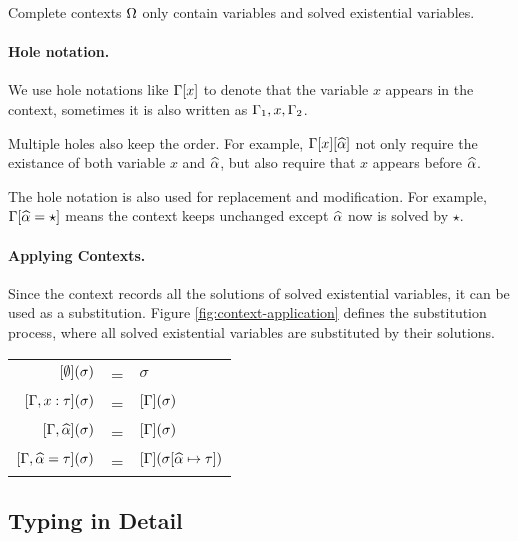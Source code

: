 Complete contexts $\Omega$ only contain variables and solved existential variables.

\paragraph{Hole notation.}
We use hole notations like $\Gamma[x]$ to
denote that the variable $x$ appears in the context, sometimes it is also
written as $\Gamma_1, x, \Gamma_2$.

Multiple holes also keep the order. For example, $\Gamma[x][\widehat{\alpha}]$ not only
require the existance of both variable $x$ and $\widehat{\alpha}$, but also require that
$x$ appears before $\widehat{\alpha}$.

The hole notation is also used for replacement and modification. For example,
$\Gamma[\widehat{\alpha} = \star]$ means the context keeps unchanged except $\widehat{\alpha}$
now is solved by $\star$.

\paragraph{Applying Contexts.} Since the context records all the solutions of
solved existential variables, it can be used as a substitution. Figure
\ref{fig:context-application} defines the substitution process, where all solved
existential variables are substituted by their solutions.

\begin{figure*}[t]
  \centering
  \begin{tabular}{rll}
    $[\emptyset](\sigma)$ & = & $\sigma$ \\
    $[\Gamma, x: \tau](\sigma)$ & = & $[\Gamma](\sigma)$ \\
    $[\Gamma, \widehat{\alpha}](\sigma)$ & = & $[\Gamma](\sigma)$ \\
    $[\Gamma, \widehat{\alpha} = \tau](\sigma)$ & = & $[\Gamma](\sigma [\widehat{\alpha} \mapsto \tau])$\\
  \end{tabular}
    \caption{Context application.}
    \label{fig:context-application}
\end{figure*}

\subsection{Typing in Detail}

\begin{figure*}[t]

    \caption{Typing and semantics.}
    \label{fig:typing}
\end{figure*}


